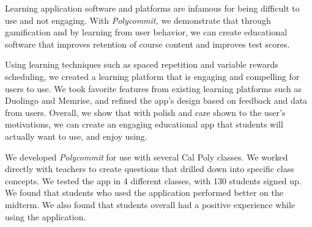 \par Learning application software and platforms are infamous for being difficult to use and not engaging. With \textit{Polycommit,} we demonstrate that through gamification and by learning from user behavior, we can create educational software that improves retention of course content and improves test scores.

\par Using learning techniques such as spaced repetition and variable rewards scheduling, we created a learning platform that is engaging and compelling for users to use. We took favorite features from existing learning platforms such as Duolingo and Memrise, and refined the app's design based on feedback and data from users. Overall, we show that with polish and care shown to the user's motivations, we can create an engaging educational app that students will actually want to use, and enjoy using.

\par We developed \textit{Polycommit} for use with several Cal Poly classes. We worked directly with teachers to create questions that drilled down into specific class concepts. We tested the app in 4 different classes, with 130 students signed up. We found that students who used the application performed better on the midterm. We also found that students overall had a positive experience while using the application.